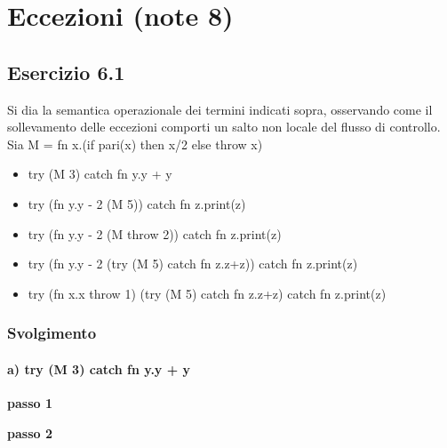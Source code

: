 \section{Eccezioni (note 8)}
\subsection*{Esercizio 6.1}
Si dia la semantica operazionale dei termini indicati sopra, osservando come il sollevamento delle eccezioni comporti un salto non locale del flusso di controllo.
Sia M = fn x.(if pari(x) then x/2 else throw x)
\begin{itemize}
	\item try (M 3) catch fn y.y + y
	\item try (fn y.y - 2 (M 5)) catch fn z.print(z)
	\item try (fn y.y - 2 (M throw 2)) catch fn z.print(z)
	\item try (fn y.y - 2 (try (M 5) catch fn z.z+z)) catch fn z.print(z)
	\item try (fn x.x throw 1) (try (M 5) catch fn z.z+z) catch fn z.print(z)
\end{itemize}  

\subsubsection*{Svolgimento} 

\paragraph{a) try (M 3) catch fn y.y + y}\mbox{}

\textbf{passo 1} 
\begin{prooftree} 
\end{prooftree}

\textbf{passo 2} \\		

